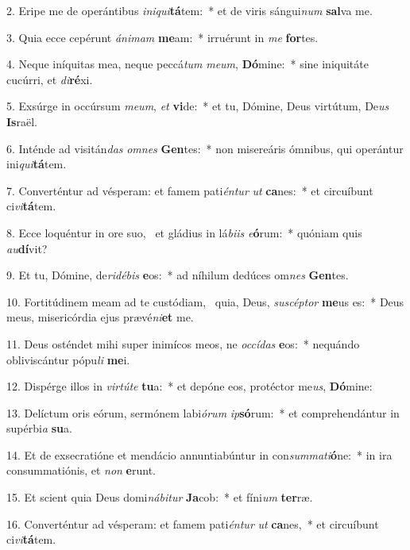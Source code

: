 2. Eripe me de operántibus \textit{in}\textit{i}\textit{qui}\textbf{tá}tem:~*  et de viris sángui\textit{num} \textbf{sal}va me.\

3. Quia ecce cepérunt \textit{á}\textit{ni}\textit{mam} \textbf{me}am:~*  irruérunt in \textit{me} \textbf{for}tes.\

4. Neque iníquitas mea, neque peccá\textit{tum} \textit{me}\textit{um}, \textbf{Dó}mine:~*  sine iniquitáte cucúrri, et \textit{di}\textbf{ré}xi.\

5. Exsúrge in occúrsum \textit{me}\textit{um}, \textit{et} \textbf{vi}de:~*  et tu, Dómine, Deus virtútum, De\textit{us} \textbf{Is}raël.\

6. Inténde ad visitán\textit{das} \textit{om}\textit{nes} \textbf{Gen}tes:~*  non misereáris ómnibus, qui operántur ini\textit{qui}\textbf{tá}tem.\

7. Converténtur ad vésperam: et famem pati\textit{én}\textit{tur} \textit{ut} \textbf{ca}nes:~*  et circuíbunt ci\textit{vi}\textbf{tá}tem.\

8. Ecce loquéntur in ore suo, \dag\  et gládius in lá\textit{bi}\textit{is} \textit{e}\textbf{ó}rum:~*  quóniam quis \textit{au}\textbf{dí}vit?\

9. Et tu, Dómine, de\textit{ri}\textit{dé}\textit{bis} \textbf{e}os:~*  ad níhilum dedúces om\textit{nes} \textbf{Gen}tes.\

10. Fortitúdinem meam ad te custódiam, \dag\  quia, Deus, \textit{su}\textit{scép}\textit{tor} \textbf{me}us es:~*  Deus meus, misericórdia ejus prævé\textit{ni}\textbf{et} me.\

11. Deus osténdet mihi super inimícos meos, ne \textit{oc}\textit{cí}\textit{das} \textbf{e}os:~*  nequándo obliviscántur pópu\textit{li} \textbf{me}i.\

12. Dispérge illos in \textit{vir}\textit{tú}\textit{te} \textbf{tu}a:~*  et depóne eos, protéctor me\textit{us}, \textbf{Dó}mine:\

13. Delíctum oris eórum, sermónem labi\textit{ó}\textit{rum} \textit{ip}\textbf{só}rum:~*  et comprehendántur in supérbi\textit{a} \textbf{su}a.\

14. Et de exsecratióne et mendácio annuntiabúntur in con\textit{sum}\textit{ma}\textit{ti}\textbf{ó}ne:~*  in ira consummatiónis, et \textit{non} \textbf{e}runt.\

15. Et scient quia Deus domi\textit{ná}\textit{bi}\textit{tur} \textbf{Ja}cob:~*  et fíni\textit{um} \textbf{ter}ræ.\

16. Converténtur ad vésperam: et famem pati\textit{én}\textit{tur} \textit{ut} \textbf{ca}nes,~*  et circuíbunt ci\textit{vi}\textbf{tá}tem.\

